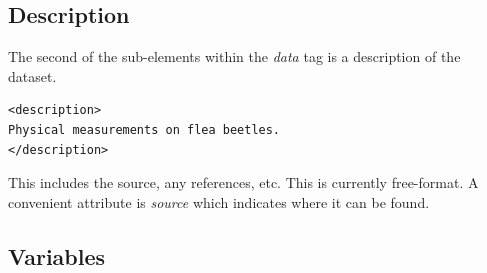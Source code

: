 \documentclass{article}
\def\strip#1>{}
\def\Escape#1{\def\next{#1}%
  {\frenchspacing\expandafter\strip\meaning\next}}
\def\file#1{\HREF{#1}{\textbf{\Escape{#1}}}}
\def\XMLTag#1{\textit{#1}}
\def\XMLAttribute#1{\textsl{#1}}
\begin{document}

\subsection{Description}

The second of the sub-elements within the \XMLTag{data} tag is
a description of the dataset.

\begin{verbatim}
<description>
Physical measurements on flea beetles.
</description>
\end{verbatim}

This includes the source, any references, etc.  This is currently
free-format.  A convenient attribute is \XMLAttribute{source} which
indicates where it can be found.

\subsection{Variables}
\end{document}
